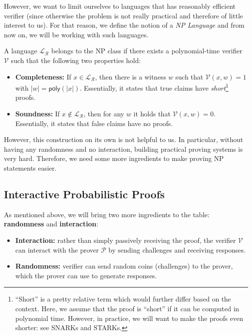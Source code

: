\documentclass[../lecture-notes-148x210.tex]{subfiles}
\begin{document}
However, we want to limit ourselves to languages that has reasonably efficient verifier (since otherwise the problem is not really practical and therefore of little interest to us). For that reason, we define the notion of a \emph{NP Language} and from now on, we will be working with such languages.

\begin{definition}[NP Language]
    A language $\mathcal{L}_{\mathcal{R}}$ belongs to the NP class if there exists a polynomial-time verifier $\mathcal{V}$ such that the following two properties hold:
    \begin{itemize}
        \item \textbf{Completeness:} If $x \in \mathcal{L}_{\mathcal{R}}$, then there is a witness $w$ such that $\mathcal{V}(x, w) = 1$ with $|w| = \mathsf{poly}(|x|)$. Essentially, it states that true claims have \textit{short}\footnote{``Short'' is a pretty relative term which would further differ based on the context. Here, we assume that the proof is ``short'' if it can be computed in polynomial time. However, in practice, we will want to make the proofs even shorter: see SNARKs and STARKs.} proofs.
        \item \textbf{Soundness:} If $x \not\in \mathcal{L}_{\mathcal{R}}$, then for any $w$ it holds that $\mathcal{V}(x, w) = 0$. Essentially, it states that false claims have no proofs.
    \end{itemize}
\end{definition}

However, this construction on its own is not helpful to us. In particular, without having any randomness and no interaction, building practical proving systems is very hard. Therefore, we need some more ingredients to make proving NP statements easier.

\subsection{Interactive Probabilistic Proofs}

As mentioned above, we will bring two more ingredients to the table: \textbf{randomness} and \textbf{interaction}:
\begin{itemize}
    \item \textbf{Interaction:} rather than simply passively receiving the proof, the verifier $\mathcal{V}$ can interact with the prover $\mathcal{P}$ by sending challenges and receiving responses.
    \item \textbf{Randomness:} verifier can send random coins (challenges) to the prover, which the prover can use to generate responses.
\end{itemize}
\end{document}
